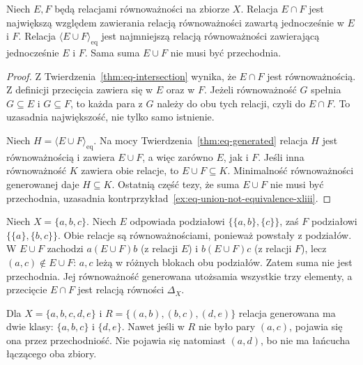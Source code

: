 \begin{twierdzenie}
\label{thm:eq-meet-join-xliii}
Niech $E,F$ będą relacjami równoważności na zbiorze $X$.
Relacja $E\cap F$ jest największą względem zawierania
relacją równoważności zawartą jednocześnie w $E$ i $F$.
Relacja $\langle E\cup F\rangle_{\mathrm{eq}}$
jest najmniejszą relacją równoważności zawierającą jednocześnie
$E$ i $F$. Sama suma $E\cup F$ nie musi być przechodnia.
\end{twierdzenie}
\begin{proof}
Z Twierdzenia~\ref{thm:eq-intersection} wynika, że $E\cap F$
jest równoważnością. Z definicji przecięcia zawiera się w
$E$ oraz w $F$. Jeżeli równoważność $G$ spełnia
$G\subseteq E$ i $G\subseteq F$, to każda para z $G$
należy do obu tych relacji, czyli do $E\cap F$.
To uzasadnia największość, nie tylko samo istnienie.

Niech $H=\langle E\cup F\rangle_{\mathrm{eq}}$.
Na mocy Twierdzenia~\ref{thm:eq-generated} relacja $H$
jest równoważnością i zawiera $E\cup F$, a więc zarówno
$E$, jak i $F$. Jeśli inna równoważność $K$ zawiera obie
relacje, to $E\cup F\subseteq K$. Minimalność
równoważności generowanej daje $H\subseteq K$.
Ostatnią część tezy, że suma $E\cup F$ nie musi być przechodnia,
uzasadnia kontrprzykład~\ref{ex:eq-union-not-equivalence-xliii}.
\end{proof}

\begin{przyklad}
\label{ex:eq-union-not-equivalence-xliii}
Niech $X=\{a,b,c\}$. Niech $E$ odpowiada podziałowi
$\{\{a,b\},\{c\}\}$, zaś $F$ podziałowi
$\{\{a\},\{b,c\}\}$. Obie relacje są równoważnościami,
ponieważ powstały z podziałów. W $E\cup F$ zachodzi
$a(E\cup F)b$ (z relacji $E$) i $b(E\cup F)c$
(z relacji $F$), lecz $(a,c)\notin E\cup F$:
$a,c$ leżą w różnych blokach obu podziałów.
Zatem suma nie jest przechodnia. Jej równoważność
generowana utożsamia wszystkie trzy elementy, a przecięcie
$E\cap F$ jest relacją równości $\Delta_X$.
\end{przyklad}



\begin{przyklad}
Dla $X=\{a,b,c,d,e\}$ i
$R=\{(a,b),(b,c),(d,e)\}$ relacja generowana ma dwie klasy:
$\{a,b,c\}$ i $\{d,e\}$. Nawet jeśli w $R$ nie było pary
$(a,c)$, pojawia się ona przez przechodniość. Nie pojawia
się natomiast $(a,d)$, bo nie ma łańcucha łączącego oba zbiory.
\end{przyklad}

